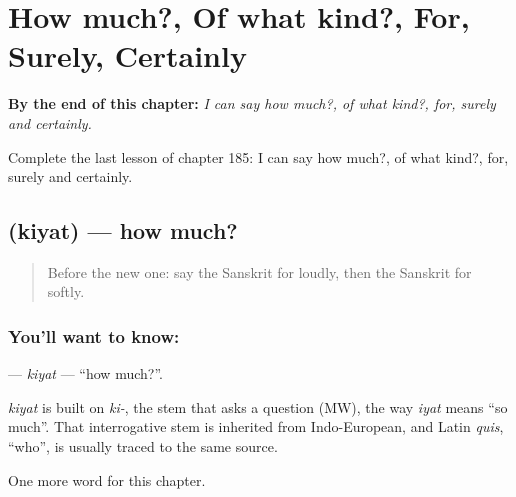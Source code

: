 
\chapter{How much?, Of what kind?, For, Surely, Certainly}
\label{ch:sa-how-much-of-what-kind-for-surely-certainly}

\begin{chapteropening}
\textbf{By the end of this chapter:} \emph{I can say how much?, of what kind?, for, surely and certainly.}

Complete the last lesson of chapter 185: I can say how much?, of what kind?, for, surely and certainly.
\end{chapteropening}

\section[\texorpdfstring{\sk{कियत्} (kiyat)}{कियत् (kiyat)}]{ (kiyat) — how much?}

\label{lesson:SA-C185-kiyat}



\begin{quote}
Before the new one: say the Sanskrit for loudly, then the Sanskrit for softly.
\end{quote}

\subsection*{You'll want to know: }
\textbf{} — \emph{kiyat} — \textquotedblleft{}how much?\textquotedblright{}.

\begin{cousinweb}
\emph{kiyat} is built on \emph{ki-}, the stem that asks a question (MW), the way \emph{iyat} means \textquotedblleft{}so much\textquotedblright{}. That interrogative stem is inherited from Indo-European, and Latin \emph{quis}, \textquotedblleft{}who\textquotedblright{}, is usually traced to the same source.
\end{cousinweb}

\begin{grammarlens}[title={What you've built}]
One more word for this chapter.
\end{grammarlens}

